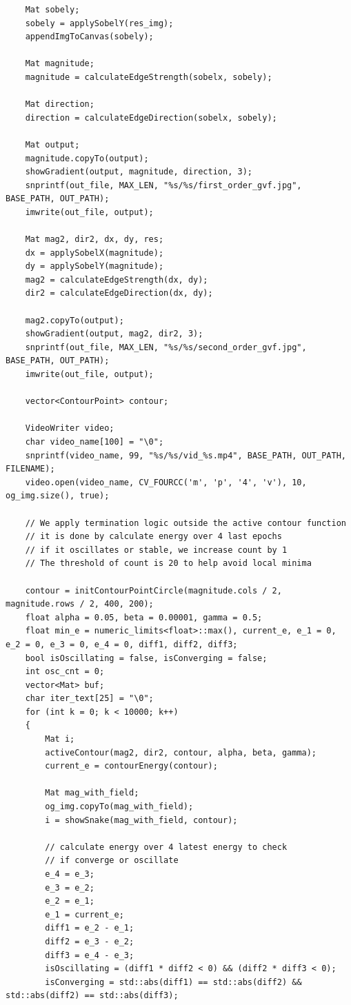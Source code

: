 \documentclass[12pt,a4paper]{report}
\begin{document}
\begin{lstlisting}
    Mat sobely;
    sobely = applySobelY(res_img);
    appendImgToCanvas(sobely);

    Mat magnitude;
    magnitude = calculateEdgeStrength(sobelx, sobely);

    Mat direction;
    direction = calculateEdgeDirection(sobelx, sobely);

    Mat output;
    magnitude.copyTo(output);
    showGradient(output, magnitude, direction, 3);
    snprintf(out_file, MAX_LEN, "%s/%s/first_order_gvf.jpg", BASE_PATH, OUT_PATH);
    imwrite(out_file, output);

    Mat mag2, dir2, dx, dy, res;
    dx = applySobelX(magnitude);
    dy = applySobelY(magnitude);
    mag2 = calculateEdgeStrength(dx, dy);
    dir2 = calculateEdgeDirection(dx, dy);

    mag2.copyTo(output);
    showGradient(output, mag2, dir2, 3);
    snprintf(out_file, MAX_LEN, "%s/%s/second_order_gvf.jpg", BASE_PATH, OUT_PATH);
    imwrite(out_file, output);

    vector<ContourPoint> contour;

    VideoWriter video;
    char video_name[100] = "\0";
    snprintf(video_name, 99, "%s/%s/vid_%s.mp4", BASE_PATH, OUT_PATH, FILENAME);
    video.open(video_name, CV_FOURCC('m', 'p', '4', 'v'), 10, og_img.size(), true);

    // We apply termination logic outside the active contour function
    // it is done by calculate energy over 4 last epochs
    // if it oscillates or stable, we increase count by 1
    // The threshold of count is 20 to help avoid local minima

    contour = initContourPointCircle(magnitude.cols / 2, magnitude.rows / 2, 400, 200);
    float alpha = 0.05, beta = 0.00001, gamma = 0.5;
    float min_e = numeric_limits<float>::max(), current_e, e_1 = 0, e_2 = 0, e_3 = 0, e_4 = 0, diff1, diff2, diff3;
    bool isOscillating = false, isConverging = false;
    int osc_cnt = 0;
    vector<Mat> buf;
    char iter_text[25] = "\0";
    for (int k = 0; k < 10000; k++)
    {
        Mat i;
        activeContour(mag2, dir2, contour, alpha, beta, gamma);
        current_e = contourEnergy(contour);

        Mat mag_with_field;
        og_img.copyTo(mag_with_field);
        i = showSnake(mag_with_field, contour);

        // calculate energy over 4 latest energy to check
        // if converge or oscillate
        e_4 = e_3;
        e_3 = e_2;
        e_2 = e_1;
        e_1 = current_e;
        diff1 = e_2 - e_1;
        diff2 = e_3 - e_2;
        diff3 = e_4 - e_3;
        isOscillating = (diff1 * diff2 < 0) && (diff2 * diff3 < 0);
        isConverging = std::abs(diff1) == std::abs(diff2) && std::abs(diff2) == std::abs(diff3);


\end{lstlisting}
\end{document}
